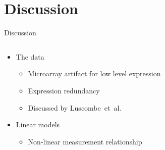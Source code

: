 \section{Discussion}
\begin{frame}{Discussion}
\begin{columns}
\begin{column}{0.5\textwidth}
\begin{itemize}
    \item<1-| handout:1-> The data
    \begin{itemize}
        \item Microarray artifact for low level expression
        \item Expression redundancy
        \item Discussed by Luscombe~et~al.~\cite{Luscombe2010}
    \end{itemize}
    \item<2-| handout:2-> Linear models
    \begin{itemize}
        \item Non-linear measurement relationship

\end{itemize}
\end{itemize}
\end{column}
\end{columns}
\end{frame}
